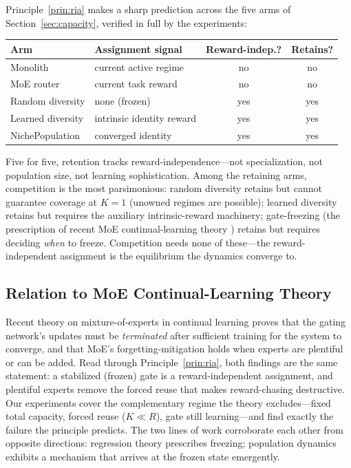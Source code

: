 \documentclass[11pt]{article}
\begin{document}
Principle~\ref{prin:ria} makes a sharp prediction across the five arms of
Section~\ref{sec:capacity}, verified in full by the experiments:

\begin{center}
\small
\begin{tabular}{llcc}
\toprule
\textbf{Arm} & \textbf{Assignment signal} & \textbf{Reward-indep.?} &
\textbf{Retains?} \\
\midrule
Monolith & current active regime & no & no \\
MoE router & current task reward & no & no \\
Random diversity & none (frozen) & yes & yes \\
Learned diversity & intrinsic identity reward & yes & yes \\
NichePopulation & converged identity & yes & yes \\
\bottomrule
\end{tabular}
\end{center}

Five for five, retention tracks reward-independence---not specialization, not
population size, not learning sophistication. Among the retaining arms,
competition is the most parsimonious: random diversity retains but cannot
guarantee coverage at $K = 1$ (unowned regimes are possible); learned diversity
retains but requires the auxiliary intrinsic-reward machinery; gate-freezing
(the prescription of recent MoE continual-learning theory \cite{li2024moecl})
retains but requires deciding \emph{when} to freeze. Competition needs none of these---the
reward-independent assignment is the equilibrium the dynamics converge to.

\subsection{Relation to MoE Continual-Learning Theory}

Recent theory on mixture-of-experts in continual learning \cite{li2024moecl}
proves that the gating network's updates must be \emph{terminated} after sufficient training for the
system to converge, and that MoE's forgetting-mitigation holds when experts are
plentiful or can be added. Read through Principle~\ref{prin:ria}, both findings
are the same statement: a stabilized (frozen) gate is a reward-independent
assignment, and plentiful experts remove the forced reuse that makes
reward-chasing destructive. Our experiments cover the complementary regime the
theory excludes---fixed total capacity, forced reuse ($K \ll R$), gate still
learning---and find exactly the failure the principle predicts. The two lines of
work corroborate each other from opposite directions: regression theory
prescribes freezing; population dynamics exhibits a mechanism that arrives at
the frozen state emergently.
\end{document}

